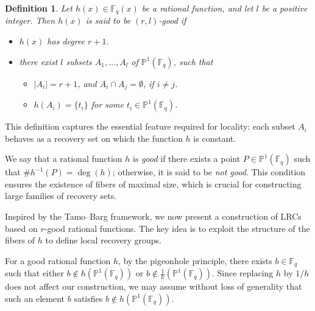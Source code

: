 \documentclass[1p,final]{elsarticle}
\newtheorem{open problem}[theorem]{Open Problem}
\newtheorem{definition}[theorem]{Definition}
\begin{document}
\begin{definition}\label{good rational}
Let $h(x)\in \mathbb{F}_q(x)$ be a rational function, and let $l$ be a positive integer. Then $h(x)$ is said to be $(r,l)$-good if
\begin{itemize}
\item[(i)] $h(x)$ has degree $r+1$.
\item[(ii)] there exist $l$ subsets $A_{1},\ldots, A_{l}$ of $\mathbb{P}^{1}(\mathbb{F}_{q})$, such that 
\begin{itemize}
	\item $|A_{i}|=r+1$, and $A_{i}\cap A_{j}=\emptyset$, if $i\ne j$.
	\item $h(A_{i})=\{t_{i}\}$ for some $t_{i}\in\mathbb{P}^{1}(\mathbb{F}_{q}) $.
\end{itemize}
\end{itemize}
\end{definition}

This definition captures the essential feature required for locality: each subset $A_i$ behaves as a recovery set on which the function $h$ is constant.

\medskip

We say that a rational function $h$ is \emph{good} if there exists a point $P\in \mathbb{P}^{1}(\mathbb{F}_{q})$ such that $\# h^{-1}(P)= \deg(h)$; otherwise, it is said to be \emph{not good}. This condition ensures the existence of fibers of maximal size, which is crucial for constructing large families of recovery sets.

\medskip

Inspired by the Tamo--Barg framework, we now present a construction of LRCs based on $r$-good rational functions. The key idea is to exploit the structure of the fibers of $h$ to define local recovery groups.

\medskip

For a good rational function $h$, by the pigeonhole principle, there exists $b\in \mathbb{F}_{q}$ such that either $b\notin h(\mathbb{P}^{1}(\mathbb{F}_{q}))$ or $b\notin \frac{1}{h}(\mathbb{P}^{1}(\mathbb{F}_{q}))$. Since replacing $h$ by $1/h$ does not affect our construction, we may assume without loss of generality that such an element $b$ satisfies $b\notin h(\mathbb{P}^{1}(\mathbb{F}_{q}))$.

\medskip
\end{document}

